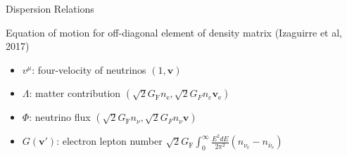 \begin{frame}{Dispersion Relations}

Equation of motion for off-diagonal element of density matrix (Izaguirre et al, 2017)





\pause

\begin{itemize}
    \item \colorbox{blue!50}{$ v^\mu$}:  four-velocity of neutrinos $(1, \boldsymbol v) $
    \item \colorbox{red!50}{$\Lambda$}: matter contribution $( \sqrt{2}G_{\mathrm F} n_{\mathrm e}, \sqrt{2}G_F n_e \boldsymbol v_{\mathrm e} )$
    \item \colorbox{ao!60}{$\Phi$}: neutrino flux $( \sqrt{2}G_{\mathrm F} n_{\nu}, \sqrt{2}G_F n_\nu \boldsymbol v )$
    \item \colorbox{armygreen!70}{$G(\boldsymbol{v}')$}: electron lepton number $\sqrt{2}G_{\mathrm F} \int_0^\infty \frac{E^2 dE}{2\pi^2} \left( n_{\nu_{\mathrm e}} - n_{\bar\nu_{\mathrm e}} \right)$
\end{itemize}



\end{frame}

